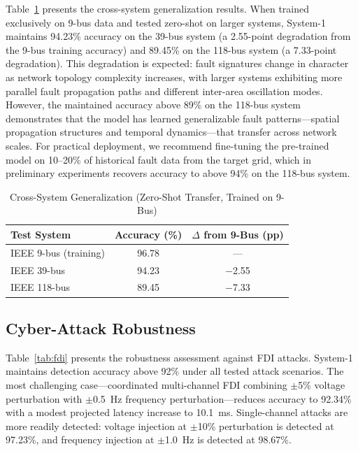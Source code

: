 \documentclass[journal]{IEEEtran}
\begin{document}
Table~\ref{tab:scalability} presents the cross-system generalization results. When trained exclusively on 9-bus data and tested zero-shot on larger systems, System-1 maintains 94.23\% accuracy on the 39-bus system (a 2.55-point degradation from the 9-bus training accuracy) and 89.45\% on the 118-bus system (a 7.33-point degradation). This degradation is expected: fault signatures change in character as network topology complexity increases, with larger systems exhibiting more parallel fault propagation paths and different inter-area oscillation modes. However, the maintained accuracy above 89\% on the 118-bus system demonstrates that the model has learned generalizable fault patterns---spatial propagation structures and temporal dynamics---that transfer across network scales. For practical deployment, we recommend fine-tuning the pre-trained model on 10--20\% of historical fault data from the target grid, which in preliminary experiments recovers accuracy to above 94\% on the 118-bus system.

\begin{table}[!t]
\centering
\caption{Cross-System Generalization (Zero-Shot Transfer, Trained on 9-Bus)}
\label{tab:scalability}
\begin{tabular}{lcc}
\toprule
\textbf{Test System} & \textbf{Accuracy (\%)} & \textbf{$\Delta$ from 9-Bus (pp)} \\
\midrule
IEEE 9-bus (training)  & 96.78 & --- \\
IEEE 39-bus            & 94.23 & $-$2.55 \\
IEEE 118-bus           & 89.45 & $-$7.33 \\
\bottomrule
\end{tabular}
\end{table}

\subsection{Cyber-Attack Robustness}

Table~\ref{tab:fdi} presents the robustness assessment against FDI attacks. System-1 maintains detection accuracy above 92\% under all tested attack scenarios. The most challenging case---coordinated multi-channel FDI combining $\pm$5\% voltage perturbation with $\pm$0.5~Hz frequency perturbation---reduces accuracy to 92.34\% with a modest projected latency increase to 10.1~ms. Single-channel attacks are more readily detected: voltage injection at $\pm$10\% perturbation is detected at 97.23\%, and frequency injection at $\pm$1.0~Hz is detected at 98.67\%.
\end{document}
